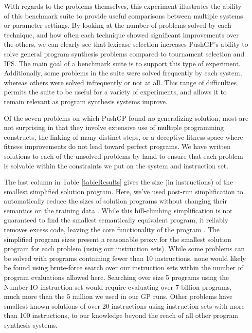\documentclass{sig-alternate}
\begin{document}
With regards to the problems themselves, this experiment illustrates the ability of this benchmark suite to provide useful comparisons between multiple systems or parameter settings. By looking at the number of problems solved by each technique, and how often each technique showed significant improvements over the others, we can clearly see that lexicase selection increases PushGP's ability to solve general program synthesis problems compared to tournament selection and IFS. The main goal of a benchmark suite is to support this type of experiment. Additionally, some problems in the suite were solved frequently by each system, whereas others were solved infrequently or not at all. This range of difficulties permits the suite to be useful for a variety of experiments, and allows it to remain relevant as program synthesis systems improve.

Of the seven problems on which PushGP found no generalizing solution, most are not surprising in that they involve extensive use of multiple programming constructs, the linking of many distinct steps, or a deceptive fitness space where fitness improvements do not lead toward perfect programs. 
We have written solutions to each of the unsolved problems by hand to ensure that each problem is solvable within the constraints we put on the system and instruction set.


The last column in Table \ref{tableResults} gives the size (in instructions) of the  smallest simplified solution program. Here, we've used post-run simplification to automatically reduce the sizes of solution programs without changing their semantics on the training data \cite{Spector:2014:GECCOcomp}. While this hill-climbing simplification is not guaranteed to find the smallest semantically equivalent program, it reliably removes excess code, leaving the core functionality of the program \cite{Spector:2014:GECCOcomp}. The simplified program sizes present a reasonable proxy for the smallest solution program for each problem (using our instruction sets). While some problems can be solved with programs containing fewer than 10 instructions, none would likely be found using brute-force search over our instruction sets within the number of program evaluations allowed here. Searching over size 5 programs using the Number IO instruction set would require evaluating over 7 billion programs, much more than the 5 million we used in our GP runs. Other problems have smallest known solutions of over 20 instructions using instruction sets with more than 100 instructions, to our knowledge beyond the reach of all other program synthesis systems.
\end{document}
